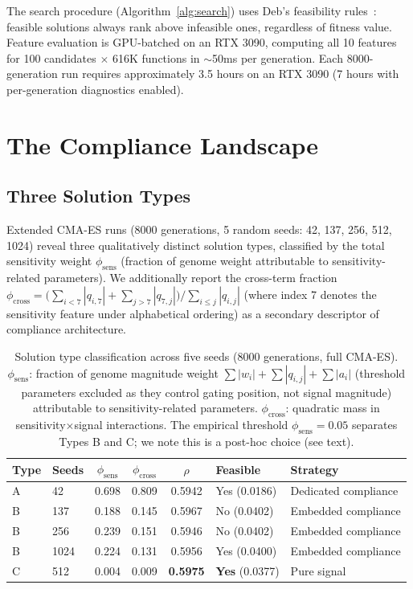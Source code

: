 \documentclass[twoside,11pt]{article}
\begin{document}
The search procedure (Algorithm~\ref{alg:search}) uses Deb's feasibility
rules~\citep{deb2000efficient}: feasible solutions always rank above infeasible
ones, regardless of fitness value. Feature evaluation is GPU-batched on an
RTX 3090, computing all 10 features for 100 candidates $\times$ 616K functions
in $\sim$50ms per generation. Each 8000-generation run requires approximately
3.5 hours on an RTX 3090 (7 hours with per-generation diagnostics enabled).

\section{The Compliance Landscape}
\label{sec:landscape}

\subsection{Three Solution Types}

Extended CMA-ES runs (8000 generations, 5 random seeds: 42, 137, 256, 512, 1024)
reveal three qualitatively distinct solution types, classified by the total
sensitivity weight $\phi_{\text{sens}}$ (fraction of genome weight attributable to
sensitivity-related parameters). We additionally report the cross-term fraction
$\phi_{\text{cross}} = \bigl(\sum_{i < 7} |q_{i,7}| + \sum_{j > 7} |q_{7,j}|\bigr) / \sum_{i \leq j} |q_{i,j}|$
(where index 7 denotes the sensitivity feature under alphabetical ordering) as a secondary descriptor of
compliance architecture.

\begin{table}[t]
\caption{Solution type classification across five seeds (8000 generations,
full CMA-ES). $\phi_{\text{sens}}$: fraction of genome magnitude weight
$\sum |w_i| + \sum |q_{i,j}| + \sum |a_i|$ (threshold parameters excluded as
they control gating position, not signal magnitude) attributable to
sensitivity-related parameters. $\phi_{\text{cross}}$: quadratic mass in sensitivity$\times$signal
interactions. The empirical threshold $\phi_{\text{sens}} = 0.05$ separates
Types B and C; we note this is a post-hoc choice (see text).}
\label{tab:types}
\centering
\begin{tabular}{llcccll}
\toprule
Type & Seeds & $\phi_{\text{sens}}$ & $\phi_{\text{cross}}$ & $\rho$ & Feasible & Strategy \\
\midrule
A & 42 & 0.698 & 0.809 & 0.5942 & Yes (0.0186) & Dedicated compliance \\
B & 137 & 0.188 & 0.145 & 0.5967 & No (0.0402) & Embedded compliance \\
B & 256 & 0.239 & 0.151 & 0.5946 & No (0.0402) & Embedded compliance \\
B & 1024 & 0.224 & 0.131 & 0.5956 & Yes (0.0400) & Embedded compliance \\
C & 512 & 0.004 & 0.009 & \textbf{0.5975} & \textbf{Yes} (0.0377) & Pure signal \\
\bottomrule
\end{tabular}
\end{table}
\end{document}
